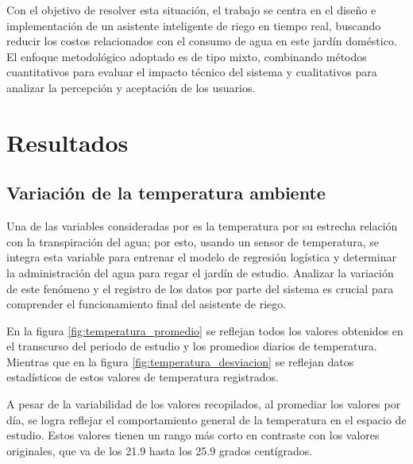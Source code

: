 \documentclass[pdflatex,sn-mathphys-num]{sn-jnl}%
\theoremstyle{thmstyleone}%
\theoremstyle{thmstyletwo}%
\theoremstyle{thmstylethree}%
\begin{document}
\begin{multicols}{2}
Con el objetivo de resolver esta situación, el trabajo se centra en el diseño e implementación de un asistente inteligente de riego en tiempo real, buscando reducir los costos relacionados con el consumo de agua en este jardín doméstico. El enfoque metodológico adoptado es de tipo mixto, combinando métodos cuantitativos para evaluar el impacto técnico del sistema y cualitativos para analizar la percepción y aceptación de los usuarios.
\section*{Resultados}\label{sec2}
\subsection*{Variación de la temperatura ambiente}
Una de las variables consideradas por \cite{ref12} es la temperatura por su estrecha relación con la transpiración del agua; por esto, usando un sensor de temperatura, se integra esta variable para entrenar el modelo de regresión logística y determinar la administración del agua para regar el jardín de estudio. Analizar la variación de este fenómeno y el registro de los datos por parte del sistema es crucial para comprender el funcionamiento final del asistente de riego.

En la figura \ref{fig:temperatura_promedio} se reflejan todos los valores obtenidos en el transcurso del periodo de estudio y los promedios diarios de temperatura. Mientras que en la figura \ref{fig:temperatura_desviacion} se reflejan datos estadísticos de estos valores de temperatura registrados. 

A pesar de la variabilidad de los valores recopilados, al promediar los valores por día, se logra reflejar el comportamiento general de la temperatura en el espacio de estudio. Estos valores tienen un rango más corto en contraste con los valores originales, que va de los 21.9 hasta los 25.9 grados centígrados.    
\end{multicols}
\end{document}
